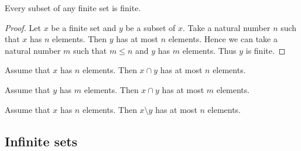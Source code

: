 \documentclass[../../set-theory.tex]{subfiles}
\begin{document}
\begin{forthel}
    \begin{corollary}\label{SetTheory_03_01_316480}
      Every subset of any finite set is finite.
    \end{corollary}
    \begin{proof}
      Let $x$ be a finite set and $y$ be a subset of $x$.
      Take a natural number $n$ such that $x$ has $n$ elements.
      Then $y$ has at most $n$ elements.
      Hence we can take a natural number $m$ such that $m \leq n$ and $y$ has $m$ elements.
      Thus $y$ is finite.
    \end{proof}

    \begin{corollary}\label{SetTheory_03_01_161265}
      Assume that $x$ has $n$ elements.
      Then $x \cap y$ has at most $n$ elements.
    \end{corollary}

    \begin{corollary}\label{SetTheory_03_01_241352}
      Assume that $y$ has $m$ elements.
      Then $x \cap y$ has at most $m$ elements.
    \end{corollary}

    \begin{corollary}
      Assume that $x$ has $n$ elements.
      Then $x \setminus y$ has at most $n$ elements.
    \end{corollary}
  \end{forthel}


  \subsection{Infinite sets}
\end{document}
